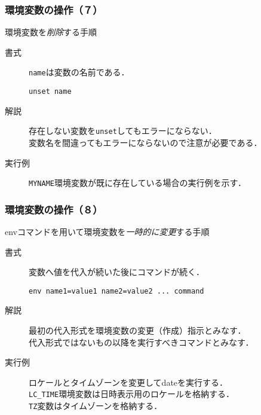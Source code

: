 \documentclass{beamer}                 %
\begin{document}
\begin{frame}[fragile]
  \frametitle{環境変数の操作（７）}
  環境変数を\emph{削除}する手順
\begin{description}
\item [書式]
  \texttt{name}は変数の名前である．
\begin{lstlisting}[numbers=none]
  unset name
\end{lstlisting}
\item [解説]
  存在しない変数を\texttt{unset}してもエラーにならない．\\
  変数名を間違ってもエラーにならないので注意が必要である．
\item [実行例]
  \texttt{MYNAME}環境変数が既に存在している場合の実行例を示す．
\end{description}
\end{frame}

\begin{frame}[fragile]
  \frametitle{環境変数の操作（８）}
  envコマンドを用いて環境変数を\emph{一時的に変更}する手順
\begin{description}
\item [書式]
  変数へ値を代入が続いた後にコマンドが続く．
\begin{lstlisting}[numbers=none]
  env name1=value1 name2=value2 ... command
\end{lstlisting}
\item [解説]
  最初の代入形式を環境変数の変更（作成）指示とみなす．\\
  代入形式ではないもの以降を実行すべきコマンドとみなす．
\item [実行例]
  ロケールとタイムゾーンを変更してdateを実行する．\\
  \texttt{LC\_TIME}環境変数は日時表示用のロケールを格納する．\\
  \texttt{TZ}変数はタイムゾーンを格納する．
\end{description}
\end{frame}
\end{document}
